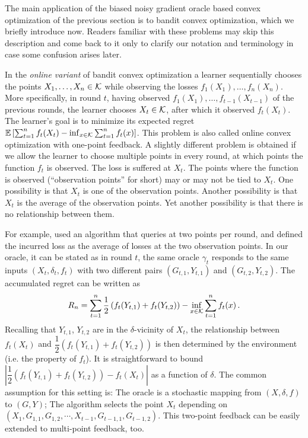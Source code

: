 The main application of the biased noisy gradient oracle based convex optimization of the previous section 
is to bandit convex optimization, which we briefly introduce now. Readers familiar with these problems may skip this description
and come back to it only to clarify our notation and terminology in case some confusion arises later.

In the \emph{online variant} of bandit convex optimization a learner sequentially chooses the points $X_1,\dots,X_n\in \mathcal{K}$ while observing the losses $f_1(X_1),\dots,f_n(X_n)$. More specifically, in round $t$, having observed $f_1(X_1),\dots,f_{t-1}(X_{t-1})$ of the previous rounds, the learner chooses $X_t\in \mathcal{K}$, after which it observed $f_t(X_t)$. The learner's goal is to minimize its expected regret $\mathbb{E}\left[ \sum_{t=1}^n f_t(X_t) - \inf_{x\in \mathcal{K}} \sum_{t=1}^n f_t(x) \right]$. 
This problem is also called online convex optimization with one-point feedback.
A slightly different problem is obtained if we allow the learner to choose multiple points in every round, at which points the function $f_t$ is observed. The loss is suffered at $X_t$. The points where the function is observed (``observation points'' for short) may or may not be tied to $X_t$. One possibility is that $X_t$ is one of the observation points.  
Another possibility is that $X_t$ is the average of the observation points. Yet another possibility is that there is no relationship between them. 

For example, \cite{AgDeXi10} used an algorithm that queries at two points per round, and defined the incurred loss as the average of losses at the two observation points. In our oracle, it can be stated as in round $t$, the same oracle $\gamma_t$ responds to the same inputs $(X_t, \delta_t, f_t)$ with two different pairs $(G_{t,1}, Y_{t,1})$ and $(G_{t,2}, Y_{t,2})$. The accumulated regret can be written as 
\[
R_n = \sum_{t=1}^n \dfrac{1}{2}\left( f_t(Y_{t,1})+f_t(Y_{t,2}) \right) -\inf_{x \in \mathcal{K}}\sum_{t=1}^n f_t(x) \,.
\]
Recalling that $Y_{t,1}$, $Y_{t,2}$ are in the $\delta$-vicinity of $X_t$, the relationship between $f_t(X_t)$ and $\dfrac{1}{2}\left( f_t(Y_{t,1})+f_t(Y_{t,2})\right)$ is then determined by the environment (i.e. the property of $f_t$). It is straightforward to bound $| \dfrac{1}{2}\left( f_t(Y_{t,1})+f_t(Y_{t,2})\right)- f_t(X_t)|$ as a function of $\delta$. 
The common assumption for this setting is: The oracle is a stochastic mapping from $(X, \delta, f)$ to $(G, Y)$; The algorithm selects the point $X_t$ depending on $\left( X_1, G_{1,1}, G_{1,2}, \cdots, X_{t-1},G_{t-1,1}, G_{t-1,2}  \right)$. This two-point feedback can be easily extended to multi-point feedback, too.

